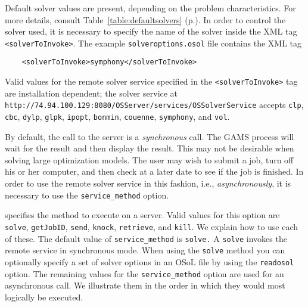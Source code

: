 Default solver values are present, depending on the problem characteristics. For more details, consult 
Table~\ref{table:defaultsolvers} (p.\pageref{table:defaultsolvers}).
In order to control the solver used, it is necessary to specify the name of the solver
inside the XML tag {\tt <solverToInvoke>}. The example  {\tt solveroptions.osol} file contains the XML tag
\begin{verbatim}
    <solverToInvoke>symphony</solverToInvoke>
\end{verbatim}

\iffalse
If, for example,  the {\tt CoinOS.opt} file is
\begin{verbatim}
solver ipopt
service http://74.94.100.129:8080/OSServer/services/OSSolverService
readosol  solveroptions.osol
writeosrl temp.osrl
\end{verbatim}
then {\tt Ipopt} is ignored as a solver option and the remote server uses the {\tt  SYMPHONY} solver.
\fi  
Valid values for the remote solver service specified in the {\tt <solverToInvoke>} tag are 
installation dependent; the solver service at 
{\tt http://74.94.100.129:8080/OSServer/services/OSSolverService} accepts
{\tt clp},  
{\tt cbc},  {\tt dylp}, {\tt glpk}, {\tt ipopt}, {\tt bonmin},   {\tt couenne},  {\tt symphony}, and 
{\tt vol}.  


\medskip



By default, the call to the server is a {\it synchronous} call. The GAMS process will wait for the result 
and then display the result. This may not be desirable when solving large optimization models.  
The user may wish to submit a job, turn off his or her computer,  and then check at a later date to see 
if the job is finished.  In order to use the remote solver service in this fashion, i.e., 
{\it asynchronously}, it  is necessary to use the  {\tt service\_method} option.

\vskip 8pt
 specifies the method to execute on a server.  
Valid values for this option are {\tt solve}, {\tt getJobID}, {\tt send}, {\tt knock}, {\tt retrieve}, 
and {\tt kill}. We explain how to use each of these.
\vskip 8pt
The default value of {\tt service\_method} is {\tt solve.} A {\tt solve} invokes the remote service 
in synchronous mode. When using the {\tt solve} method you can optionally specify a set of solver options 
in an OSoL file  by using the {\tt readosol} option. The  remaining values for the {\tt service\_method} 
option are used for an asynchronous call.  We illustrate them in the order in which they would most 
logically be executed. 

